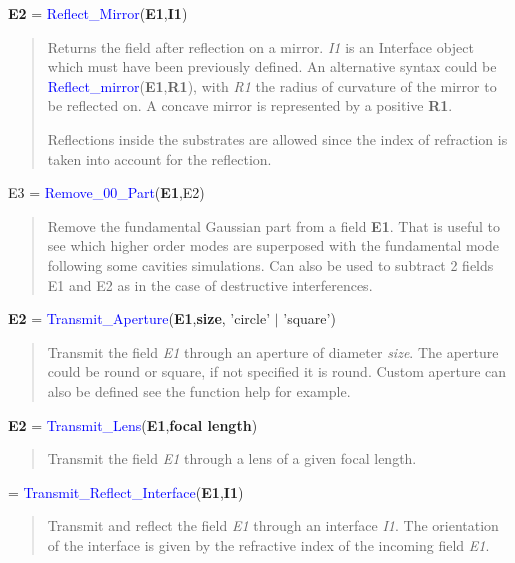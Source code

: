 \noindent \textbf{E2} = \textcolor{blue}{Reflect\_Mirror}(\textbf{E1},\textbf{I1})
\vspace*{-0.2cm}
\begin{quote}
Returns the field after reflection on a mirror. \textsl{I1} is an Interface object which must have been previously defined. An alternative syntax could be \textcolor{blue}{Reflect\_mirror}(\textbf{E1},\textbf{R1}), with \textsl{R1} the radius of curvature of the mirror to be reflected on. A concave mirror is represented by a positive \textbf{R1}.

Reflections inside the substrates are allowed since the index of refraction is taken into account for the reflection.
\end{quote}


\noindent E3 = \textcolor{blue}{ Remove\_00\_Part}(\textbf{E1},E2)
\vspace*{-0.2cm}
\begin{quote}
Remove the fundamental Gaussian part from a field \textbf{E1}. That is useful to see which higher order modes are superposed with the fundamental mode following some cavities simulations. Can also be used to subtract 2 fields E1 and E2 as in the case of destructive interferences.
\end{quote}


\noindent \textbf{E2} = \textcolor{blue}{Transmit\_Aperture}(\textbf{E1},\textbf{size}, 'circle' $\mid$ 'square')
\vspace*{-0.2cm}
\begin{quote}
Transmit the field \textsl{E1} through an aperture of diameter \textsl{size}. The aperture could be round or square, if not specified it is round. Custom aperture can also be defined see the function help for example.
\end{quote}

\noindent \textbf{E2} = \textcolor{blue}{Transmit\_Lens}(\textbf{E1},\textbf{focal length})
\vspace*{-0.2cm}
\begin{quote}
Transmit the field \textsl{E1} through a lens of a given focal length.
\end{quote}

= \textcolor{blue}{Transmit\_Reflect\_Interface}(\textbf{E1},\textbf{I1})
\vspace*{-0.2cm}
\begin{quote}
Transmit and reflect the field \textsl{E1} through an interface \textsl{I1}. The orientation of the interface is given by the refractive index of the incoming field \textsl{E1}.
\end{quote}

